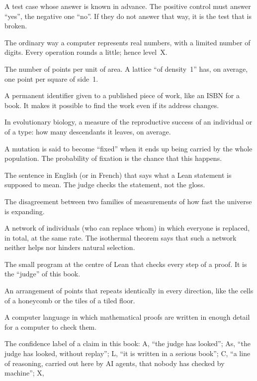 \begin{description}[style=nextline,leftmargin=0pt,font=\normalfont\sffamily\bfseries\color{okbleu},itemsep=5pt]
\item[Control (positive, negative)] A test case whose answer is known in advance. The positive control must answer
``yes'', the negative one ``no''. If they do not answer that way, it is the test that is broken.
\item[Decimal (floating-point) number] The ordinary way a computer represents real numbers, with a limited number of
digits. Every operation rounds a little; hence level~X.
\item[Density] The number of points per unit of area. A lattice ``of density~1'' has, on average, one point per square
of side~1.
\item[DOI] A permanent identifier given to a published piece of work, like an ISBN for a book. It makes it possible to
find the work even if its address changes.
\item[Fitness] In evolutionary biology, a measure of the reproductive success of an individual or of a type: how many
descendants it leaves, on average.
\item[Fixation] A mutation is said to become ``fixed'' when it ends up being carried by the whole population. The
probability of fixation is the chance that this happens.
\item[Gloss] The sentence in English (or in French) that says what a Lean statement is supposed to mean. The judge checks
the statement, not the gloss.
\item[Hubble tension] The disagreement between two families of measurements of how fast the universe is expanding.
\item[Isothermal graph] A network of individuals (who can replace whom) in which everyone is replaced, in total, at the
same rate. The isothermal theorem says that such a network neither helps nor hinders natural selection.
\item[Kernel] The small program at the centre of Lean that checks every step of a proof. It is the ``judge'' of this
book.
\item[Lattice (crystal)] An arrangement of points that repeats identically in every direction, like the cells of a
honeycomb or the tiles of a tiled floor.
\item[Lean] A computer language in which mathematical proofs are written in enough detail for a computer to check them.
\item[Level (A, As, L, C, X)] The confidence label of a claim in this book: A, ``the judge has looked''; As, ``the judge
has looked, without replay''; L, ``it is written
in a serious book''; C, ``a line of reasoning, carried out here by AI agents, that nobody has checked by machine''; X,

\end{description}
